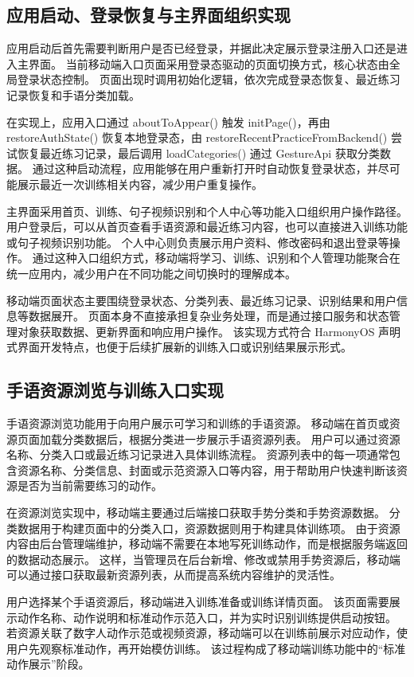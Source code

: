 \subsection{应用启动、登录恢复与主界面组织实现}

应用启动后首先需要判断用户是否已经登录，并据此决定展示登录注册入口还是进入主界面。
当前移动端入口页面采用登录态驱动的页面切换方式，核心状态由全局登录状态控制。
页面出现时调用初始化逻辑，依次完成登录态恢复、最近练习记录恢复和手语分类加载。

在实现上，应用入口通过 aboutToAppear() 触发 initPage()，再由 restoreAuthState() 恢复本地登录态，由 restoreRecentPracticeFromBackend() 尝试恢复最近练习记录，最后调用 loadCategories() 通过 GestureApi 获取分类数据。
通过这种启动流程，应用能够在用户重新打开时自动恢复登录状态，并尽可能展示最近一次训练相关内容，减少用户重复操作。

主界面采用首页、训练、句子视频识别和个人中心等功能入口组织用户操作路径。
用户登录后，可以从首页查看手语资源和最近练习内容，也可以直接进入训练功能或句子视频识别功能。
个人中心则负责展示用户资料、修改密码和退出登录等操作。
通过这种入口组织方式，移动端将学习、训练、识别和个人管理功能聚合在统一应用内，减少用户在不同功能之间切换时的理解成本。

移动端页面状态主要围绕登录状态、分类列表、最近练习记录、识别结果和用户信息等数据展开。
页面本身不直接承担复杂业务处理，而是通过接口服务和状态管理对象获取数据、更新界面和响应用户操作。
该实现方式符合 HarmonyOS 声明式界面开发特点，也便于后续扩展新的训练入口或识别结果展示形式。

\subsection{手语资源浏览与训练入口实现}

手语资源浏览功能用于向用户展示可学习和训练的手语资源。
移动端在首页或资源页面加载分类数据后，根据分类进一步展示手语资源列表。
用户可以通过资源名称、分类入口或最近练习记录进入具体训练流程。
资源列表中的每一项通常包含资源名称、分类信息、封面或示范资源入口等内容，用于帮助用户快速判断该资源是否为当前需要练习的动作。

在资源浏览实现中，移动端主要通过后端接口获取手势分类和手势资源数据。
分类数据用于构建页面中的分类入口，资源数据则用于构建具体训练项。
由于资源内容由后台管理端维护，移动端不需要在本地写死训练动作，而是根据服务端返回的数据动态展示。
这样，当管理员在后台新增、修改或禁用手势资源后，移动端可以通过接口获取最新资源列表，从而提高系统内容维护的灵活性。

用户选择某个手语资源后，移动端进入训练准备或训练详情页面。
该页面需要展示动作名称、动作说明和标准动作示范入口，并为实时识别训练提供启动按钮。
若资源关联了数字人动作示范或视频资源，移动端可以在训练前展示对应动作，使用户先观察标准动作，再开始模仿训练。
该过程构成了移动端训练功能中的“标准动作展示”阶段。

